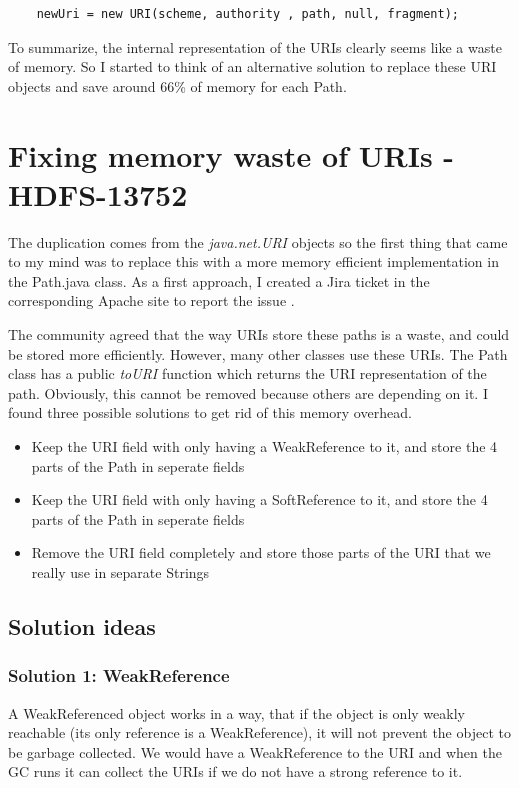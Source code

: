 \begin{lstlisting}
	newUri = new URI(scheme, authority , path, null, fragment);
\end{lstlisting}

To summarize, the internal representation of the URIs clearly seems like a waste of memory. So I started to think of an alternative solution to replace these URI objects and save around 66\% of memory for each Path. 

\chapter{Fixing memory waste of URIs - HDFS-13752}
The duplication comes from the \textit{java.net.URI} objects so the first thing that came to my mind was to replace this with a more memory efficient implementation in the Path.java class. As a first approach, I created a Jira ticket in the corresponding Apache site to report the issue \cite{hdfs-path}. 

The community agreed that the way URIs store these paths is a waste, and could be stored more efficiently. However, many other classes use these URIs. The Path class has a public \textit{toURI} function which returns the URI representation of the path. Obviously, this cannot be removed because others are depending on it. I found three possible solutions to get rid of this memory overhead.

\begin{itemize}
	\item Keep the URI field with only having a WeakReference to it, and store the 4 parts of the Path in seperate fields
	\item Keep the URI field with only having a SoftReference to it, and store the 4 parts of the Path in seperate fields
	\item Remove the URI field completely and store those parts of the URI that we really use in separate Strings
\end{itemize}
\section{Solution ideas}
\subsection{Solution 1: WeakReference}
A WeakReferenced object works in a way, that if the object is only weakly reachable (its only reference is a WeakReference), it will not prevent the object to be garbage collected. We would have a WeakReference to the URI and when the GC runs it can collect the URIs if we do not have a strong reference to it. 

